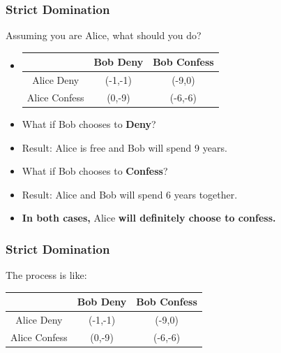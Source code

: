 \documentclass{beamer}
\begin{document}
\begin{frame}
\frametitle{Strict Domination}
Assuming you are {\color{blue}Alice}, what should you do?\\
\begin{itemize}[<+->]
\item
\begin{tabular}{|c|c|c|}
\hline
\hline
    &{\color{red}Bob} Deny&{\color{red}Bob} Confess\\
\hline
{\color{blue}Alice} Deny& ({\color{blue}-1},{\color{red}-1}) & ({\color{blue}-9},{\color{red}0})\\
\hline
{\color{blue}Alice} Confess& ({\color{blue}0},{\color{red}-9}) & ({\color{blue}-6},{\color{red}-6})\\
\hline
\hline
\end{tabular}

\item
What if {\color{red}Bob} chooses to \textbf{Deny}?
\item
Result: {\color{blue}Alice} is free and {\color{red}Bob} will spend 9 years.
\item
What if {\color{red}Bob} chooses to \textbf{Confess}?
\item
Result: {\color{blue}Alice} and {\color{red}Bob} will spend 6 years together.
\item
\textbf{In both cases, }{\color{blue}Alice}\textbf{ will definitely choose to confess.}
\end{itemize}
\end{frame}

\begin{frame}
\frametitle{Strict Domination}
The process is like:\\
\centering
\begin{tabular}{|c|c|c|}
\hline
\hline
    &{\color{red}Bob} Deny&{\color{red}Bob} Confess\\
\hline
{\color{blue}Alice} Deny& ({\color{blue}-1},{\color{red}-1}) & ({\color{blue}-9},{\color{red}0})\\
\hline
{\color{blue}Alice} Confess& ({\color{blue}0},{\color{red}-9}) & ({\color{blue}-6},{\color{red}-6})\\
\hline
\hline
\end{tabular}
\end{frame}
\end{document}
